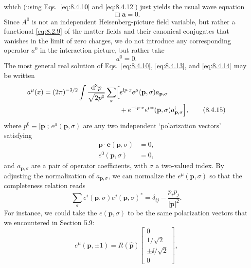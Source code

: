 which (using Eqs.~\eqref{eq:8.4.10} and \eqref{eq:8.4.12}) just yields the usual wave equation
\begin{equation}
\Box\mathbf a=0.
\tag{8.4.13}\label{eq:8.4.13}
\end{equation}
Since $A^0$ is not an independent Heisenberg-picture field variable, but rather
a functional \eqref{eq:8.2.9} of the matter fields and their canonical conjugates that
vanishes in the limit of zero charges, we do not introduce any corresponding
operator $a^0$ in the interaction picture, but rather take
\begin{equation}
a^0=0.
\tag{8.4.14}\label{eq:8.4.14}
\end{equation}
The most general real solution of Eqs.~\eqref{eq:8.4.10}, \eqref{eq:8.4.13}, and \eqref{eq:8.4.14} may
be written
\begin{align}
a^\mu(x)=(2\pi)^{-3/2}\int\frac{\mathop{}\!\mathrm{d}^3p}{\sqrt{2p^0}}\sum_\sigma
\Bigl[&e^{\mathrm{i} p\cdot x}e^\mu(\mathbf p,\sigma)a_{\mathbf p,\sigma}
\notag\\[-2pt]
&+e^{-\mathrm{i} p\cdot x}e^{\mu *}(\mathbf p,\sigma)
  a^\dagger_{\mathbf p,\sigma}\Bigr],
\tag{8.4.15}\label{eq:8.4.15}
\end{align}
where $p^0\equiv\lvert\mathbf p\rvert$; $e^\mu(\mathbf p,\sigma)$ are any two
independent `polarization vectors' satisfying
\begin{align}
\mathbf p\cdot\mathbf e(\mathbf p,\sigma)&=0,
\tag{8.4.16}\label{eq:8.4.16}\\
e^0(\mathbf p,\sigma)&=0,
\tag{8.4.17}\label{eq:8.4.17}
\end{align}
and $a_{\mathbf p,\sigma}$ are a pair of operator coefficients, with $\sigma$ a
two-valued index. By adjusting the normalization of $a_{\mathbf p,\sigma}$, we
can normalize the $e^\mu(\mathbf p,\sigma)$ so that the completeness relation
reads
\begin{equation}
\sum_\sigma e^i(\mathbf p,\sigma)e^j(\mathbf p,\sigma)^*
=\delta_{ij}-\frac{p_i p_j}{\lvert\mathbf p\rvert^2}.
\tag{8.4.18}\label{eq:8.4.18}
\end{equation}
For instance, we could take the $e(\mathbf p,\sigma)$ to be the same
polarization vectors that we encountered in Section 5.9:
\begin{equation}
e^\mu(\mathbf p,\mathord\pm1)=R(\widehat{\mathbf p})
\begin{bmatrix}
0\\[1pt]1/\sqrt2\\[1pt]\mathord\pm \ii/\sqrt2\\[1pt]0
\end{bmatrix},
\tag{8.4.19}\label{eq:8.4.19}
\end{equation}
